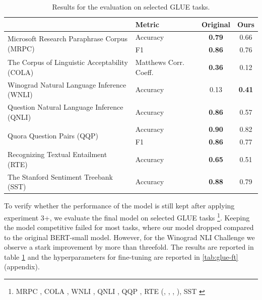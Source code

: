 \documentclass{article}
\begin{document}
\begin{table}[!h]
    \centering
    \begin{tabular}{l|l|cc}
                                                        & Metric        & Original      & Ours   \\ \hline
        \multirow{2}{*}{Microsoft Research Paraphrase Corpus (MRPC)}     & Accuracy      & \textbf{0.79}          & 0.66   \\
                                                        & F1            & \textbf{0.86}          & 0.76   \\ \hline
        The Corpus of Linguistic Acceptability (COLA)   & Matthews Corr. Coeff.     & \textbf{0.36}          & 0.12 \\ \hline
        Winograd Natural Language Inference (WNLI)      & Accuracy      & 0.13          & \textbf{0.41} \\ \hline
        Question Natural Language Inference (QNLI)      & Accuracy      & \textbf{0.86}          & 0.57  \\ \hline
        \multirow{2}{*}{Quora Question Pairs (QQP)}     & Accuracy      & \textbf{0.90}          & 0.82 \\ 
                             & F1            & \textbf{0.86}          & 0.77 \\ \hline
        
        Recognizing Textual Entailment (RTE)            & Accuracy      & \textbf{0.65}          & 0.51 \\ \hline
        The Stanford Sentiment Treebank (SST)           & Accuracy      & \textbf{0.88}          & 0.79 \\ \hline
    \end{tabular}
    \caption{Results for the evaluation on selected GLUE tasks.}
    \label{tab:glue}
\end{table}

To verify whether the performance of the model is still kept after applying experiment 3+, we evaluate the final model on selected GLUE tasks \citep{wang-etal-2018-glue} \footnote{MRPC \citep{dolan2005automatically}, COLA \citep{warstadt2018neural}, WNLI \citep{levesque2012winograd}, QNLI \citep{rajpurkar-etal-2016-squad}, QQP \citep{iyer-qqp-2016}, RTE (\cite{dagan-rte-2006}, \cite{haim2006second}, \cite{giampiccolo-etal-2007-third}, \cite{bentivogli2009fifth}), SST \citep{socher-etal-2013-recursive}}. Keeping the model competitive failed for most tasks, where our model dropped compared to the original BERT-small model. However, for the Winograd NLI Challenge \citep{levesque2012winograd} we observe a stark improvement by more than threefold. The results are reported in table \ref{tab:glue} and the hyperparameters for fine-tuning are reported in \ref{tab:glue-ft} (appendix).
\end{document}
